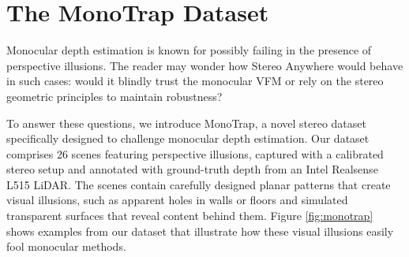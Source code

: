 \documentclass[10pt,twocolumn,letterpaper]{article}
\newcommand{\method}[0]{Stereo Anywhere\xspace}
\newcommand{\dataset}[0]{MonoTrap\xspace}
\begin{document}
\phantom{Invisible Text}
\vspace{-\baselineskip}

\section{The \dataset Dataset}


Monocular depth estimation is known for possibly failing in the presence of perspective illusions.
The reader may wonder how \method would behave in such cases: would it blindly trust the monocular VFM or rely on the stereo geometric principles to maintain robustness?

To answer these questions, we introduce MonoTrap, a novel stereo dataset specifically designed to challenge monocular depth estimation. Our dataset comprises 26 scenes featuring perspective illusions, captured with a calibrated stereo setup and annotated with ground-truth depth from an Intel Realsense L515 LiDAR.
The scenes contain carefully designed planar patterns that create visual illusions, such as apparent holes in walls or floors and simulated transparent surfaces that reveal content behind them.
Figure \ref{fig:monotrap} shows examples from our dataset that illustrate how these visual illusions easily fool monocular methods.
\end{document}
